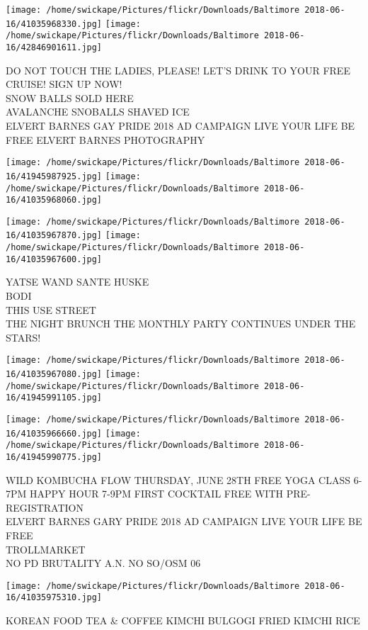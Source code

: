 \documentclass[10pt,letterpaper]{article}
\begin{document}
\texttt{[image: /home/swickape/Pictures/flickr/Downloads/Baltimore 2018-06-16/41035968330.jpg]}
\texttt{[image: /home/swickape/Pictures/flickr/Downloads/Baltimore 2018-06-16/42846901611.jpg]}

DO NOT TOUCH THE LADIES, PLEASE!  LET'S DRINK TO YOUR FREE CRUISE!  SIGN UP NOW!\\
SNOW BALLS SOLD HERE\\
AVALANCHE SNOBALLS SHAVED ICE\\
ELVERT BARNES GAY PRIDE 2018 AD CAMPAIGN LIVE YOUR LIFE BE FREE ELVERT BARNES PHOTOGRAPHY\\
\pagebreak

\texttt{[image: /home/swickape/Pictures/flickr/Downloads/Baltimore 2018-06-16/41945987925.jpg]}
\texttt{[image: /home/swickape/Pictures/flickr/Downloads/Baltimore 2018-06-16/41035968060.jpg]}

\texttt{[image: /home/swickape/Pictures/flickr/Downloads/Baltimore 2018-06-16/41035967870.jpg]}
\texttt{[image: /home/swickape/Pictures/flickr/Downloads/Baltimore 2018-06-16/41035967600.jpg]}

YATSE WAND SANTE HUSKE\\
BODI\\
THIS USE STREET\\
THE NIGHT BRUNCH THE MONTHLY PARTY CONTINUES UNDER THE STARS!\\
\pagebreak

\texttt{[image: /home/swickape/Pictures/flickr/Downloads/Baltimore 2018-06-16/41035967080.jpg]}
\texttt{[image: /home/swickape/Pictures/flickr/Downloads/Baltimore 2018-06-16/41945991105.jpg]}

\texttt{[image: /home/swickape/Pictures/flickr/Downloads/Baltimore 2018-06-16/41035966660.jpg]}
\texttt{[image: /home/swickape/Pictures/flickr/Downloads/Baltimore 2018-06-16/41945990775.jpg]}

WILD KOMBUCHA FLOW THURSDAY, JUNE 28TH FREE YOGA CLASS 6{-}7PM HAPPY HOUR 7{-}9PM FIRST COCKTAIL FREE WITH PRE{-}REGISTRATION\\
ELVERT BARNES GARY PRIDE 2018 AD CAMPAIGN LIVE YOUR LIFE BE FREE\\
TROLLMARKET\\
NO PD BRUTALITY A.N. NO SO/OSM 06\\
\pagebreak

\texttt{[image: /home/swickape/Pictures/flickr/Downloads/Baltimore 2018-06-16/41035975310.jpg]}

KOREAN FOOD TEA \& COFFEE KIMCHI BULGOGI FRIED KIMCHI RICE\\
\pagebreak
\end{document}
